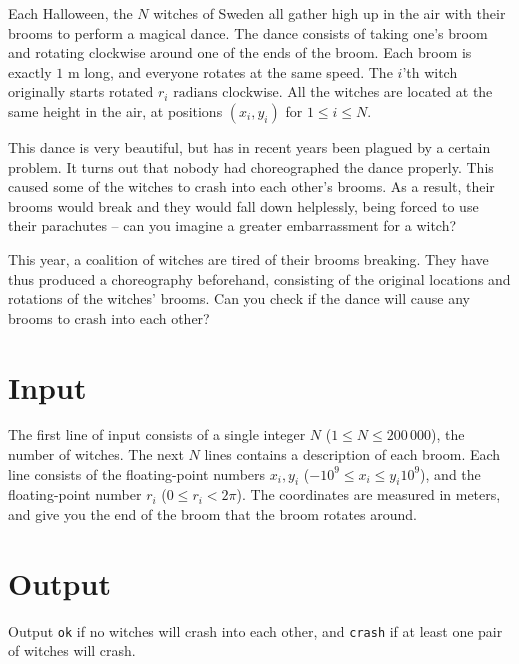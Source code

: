 Each Halloween, the $N$ witches of Sweden all gather high up in the air with their brooms to perform a magical dance.
The dance consists of taking one's broom and rotating clockwise around one of the ends of the broom.
Each broom is exactly $1\text{ m}$ long, and everyone rotates at the same speed.
The $i$'th witch originally starts rotated $r_i\text{ radians}$ clockwise.
All the witches are located at the same height in the air, at positions $(x_i, y_i)$ for $1 \le i \le N$.

This dance is very beautiful, but has in recent years been plagued by a certain problem.
It turns out that nobody had choreographed the dance properly.
This caused some of the witches to crash into each other's brooms.
As a result, their brooms would break and they would fall down helplessly, being forced to use their parachutes -- can you imagine a greater embarrassment for a witch?

This year, a coalition of witches are tired of their brooms breaking.
They have thus produced a choreography beforehand, consisting of the original locations and rotations of the witches' brooms.
Can you check if the dance will cause any brooms to crash into each other?

\section*{Input}
The first line of input consists of a single integer $N$ ($1 \le N \le 200\,000$), the number of witches.
The next $N$ lines contains a description of each broom.
Each line consists of the floating-point numbers $x_i, y_i$ ($-10^{9} \le x_i \le y_i 10^{9}$), and the floating-point number $r_i$ ($0 \le r_i < 2\pi$).
The coordinates are measured in meters, and give you the end of the broom that the broom rotates around.

\section*{Output}
Output \texttt{ok} if no witches will crash into each other, and \texttt{crash} if at least one pair of witches will crash.
